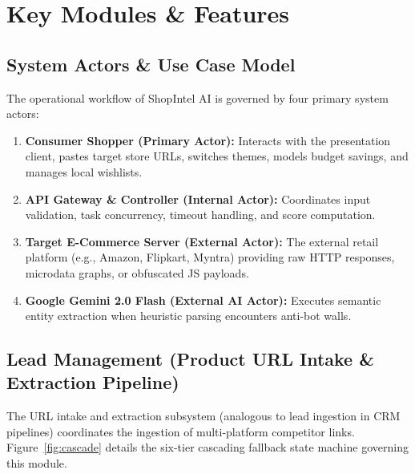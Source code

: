 \documentclass[12pt,a4paper,oneside]{report}
\begin{document}
\chapter{Key Modules \& Features}

\section{System Actors \& Use Case Model}
The operational workflow of ShopIntel AI is governed by four primary system actors:
\begin{enumerate}
    \item \textbf{Consumer Shopper (Primary Actor):} Interacts with the presentation client, pastes target store URLs, switches themes, models budget savings, and manages local wishlists.
    \item \textbf{API Gateway \& Controller (Internal Actor):} Coordinates input validation, task concurrency, timeout handling, and score computation.
    \item \textbf{Target E-Commerce Server (External Actor):} The external retail platform (e.g., Amazon, Flipkart, Myntra) providing raw HTTP responses, microdata graphs, or obfuscated JS payloads.
    \item \textbf{Google Gemini 2.0 Flash (External AI Actor):} Executes semantic entity extraction when heuristic parsing encounters anti-bot walls.
\end{enumerate}

\section{Lead Management (Product URL Intake \& Extraction Pipeline)}
The URL intake and extraction subsystem (analogous to lead ingestion in CRM pipelines) coordinates the ingestion of multi-platform competitor links. Figure~\ref{fig:cascade} details the six-tier cascading fallback state machine governing this module.
\end{document}
